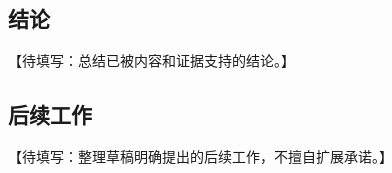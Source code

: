 \subsection{结论}\label{sec:conclusion-summary}

【待填写：总结已被内容和证据支持的结论。】

\subsection{后续工作}\label{sec:future-work}

【待填写：整理草稿明确提出的后续工作，不擅自扩展承诺。】
